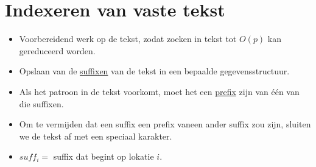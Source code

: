 \documentclass{report}
\begin{document}
\chapter{Indexeren van vaste tekst}
\begin{itemize}
	\item[\info] Voorbereidend werk op de tekst, zodat zoeken in tekst tot $O(p)$ kan gereduceerd worden.
	\item[\info] Opslaan van de \underline{suffixen} van de tekst in een bepaalde gegevensstructuur.
	\item[\info] Als het patroon in de tekst voorkomt, moet het een \underline{prefix} zijn van één van die suffixen.
	\item[\info] Om te vermijden dat een suffix een prefix vaneen ander suffix zou zijn, sluiten we de tekst af met een speciaal karakter.
	\item[\info] $suff_i = $ suffix dat begint op lokatie $i$.   

\end{itemize}
\end{document}
